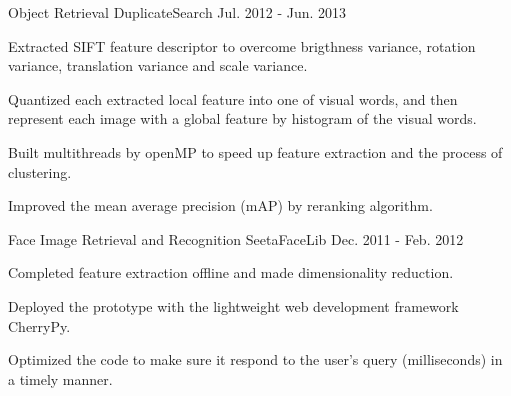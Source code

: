 \begin{cventries}
  \cventry
    {Object Retrieval} %
    {DuplicateSearch} %
    {} %
    {Jul. 2012 - Jun. 2013} %
    {
      \begin{cvitems} %
        \item {Extracted SIFT feature descriptor to overcome brigthness variance, rotation variance, translation variance and scale variance.}
        \item {Quantized each extracted local feature into one of visual words, and then represent each image with a global feature by histogram of the visual words.}
        \item {Built multithreads by openMP to speed up feature extraction and the process of clustering.}
        \item {Improved the mean average precision (mAP) by reranking algorithm.}
      \end{cvitems}
    }

  \cventry
    {Face Image Retrieval and Recognition} %
    {SeetaFaceLib} %
    {} %
    {Dec. 2011 - Feb. 2012} %
    {
      \begin{cvitems} %
        \item {Completed feature extraction offline and made dimensionality reduction.}
        \item {Deployed the prototype with the lightweight web development framework CherryPy.}
        \item {Optimized the code to make sure it respond to the user’s query (milliseconds) in a timely manner.}
      \end{cvitems}
    }

\end{cventries}
